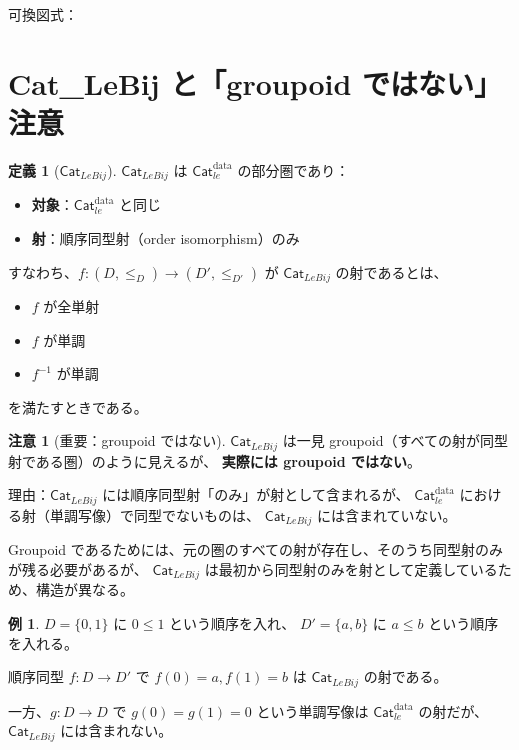 \documentclass[a4paper,12pt]{ltjsarticle}
\theoremstyle{definition}
\newtheorem{definition}{定義}[section]
\newtheorem{example}{例}[section]
\newtheorem{remark}{注意}[section]
\begin{document}
可換図式：
\begin{center}
\end{center}


\section{Cat\_LeBij と「groupoid ではない」注意}

\begin{definition}[$\mathsf{Cat}_{LeBij}$]
$\mathsf{Cat}_{LeBij}$ は $\mathsf{Cat}_{le}^{\text{data}}$ の部分圏であり：
\begin{itemize}
  \item \textbf{対象}：$\mathsf{Cat}_{le}^{\text{data}}$ と同じ
  \item \textbf{射}：順序同型射（order isomorphism）のみ
\end{itemize}

すなわち、$f : (D, \le_D) \to (D', \le_{D'})$ が $\mathsf{Cat}_{LeBij}$ の射であるとは、
\begin{itemize}
  \item $f$ が全単射
  \item $f$ が単調
  \item $f^{-1}$ が単調
\end{itemize}
を満たすときである。
\end{definition}

\begin{remark}[重要：groupoid ではない]
$\mathsf{Cat}_{LeBij}$ は一見 groupoid（すべての射が同型射である圏）のように見えるが、
\textbf{実際には groupoid ではない}。

理由：$\mathsf{Cat}_{LeBij}$ には順序同型射「のみ」が射として含まれるが、
$\mathsf{Cat}_{le}^{\text{data}}$ における射（単調写像）で同型でないものは、
$\mathsf{Cat}_{LeBij}$ には含まれていない。

Groupoid であるためには、元の圏のすべての射が存在し、そのうち同型射のみが残る必要があるが、
$\mathsf{Cat}_{LeBij}$ は最初から同型射のみを射として定義しているため、構造が異なる。
\end{remark}

\begin{example}
$D = \{0, 1\}$ に $0 \le 1$ という順序を入れ、
$D' = \{a, b\}$ に $a \le b$ という順序を入れる。

順序同型 $f : D \to D'$ で $f(0) = a, f(1) = b$ は $\mathsf{Cat}_{LeBij}$ の射である。

一方、$g : D \to D$ で $g(0) = g(1) = 0$ という単調写像は $\mathsf{Cat}_{le}^{\text{data}}$ の射だが、
$\mathsf{Cat}_{LeBij}$ には含まれない。
\end{example}
\end{document}
